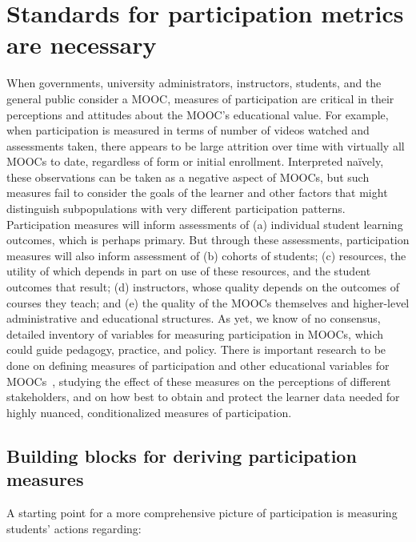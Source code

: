 \section{Standards for participation metrics are necessary}




When governments, university administrators, instructors, students, and
the general public consider a MOOC, measures of participation are
critical in their perceptions and attitudes about the MOOC's educational
value. For example, when participation is measured in terms of number of
videos watched and assessments taken, there appears to be large
attrition over time with virtually all MOOCs to date, regardless of form
or initial enrollment. Interpreted na\"{i}vely, these observations can be
taken as a negative aspect of MOOCs, but such measures fail to consider
the goals of the learner and other factors that might distinguish
subpopulations with very different participation patterns.
Participation measures will inform assessments of (a) individual student
learning outcomes, which is perhaps primary. But through these
assessments, participation measures will also inform assessment of (b)
cohorts of students; (c) resources, the utility of which depends in part
on use of these resources, and the student outcomes that result; (d)
instructors, whose quality depends on the outcomes of courses they
teach; and (e) the quality of the MOOCs themselves and higher-level
administrative and educational structures.  As yet, we know of no
consensus, detailed inventory of variables for measuring participation
in MOOCs, which could guide pedagogy, practice, and policy.
There is
important research to be done on defining measures of participation and
other educational variables for MOOCs~\cite{deboer-ho-reconceptualizing},
studying the effect of these measures on the perceptions of different
stakeholders, and on how best to obtain and protect the
learner data needed for highly nuanced, conditionalized
measures of participation.  

\subsection{Building blocks for deriving participation measures}

A starting point for a more comprehensive picture of
participation is measuring students' actions regarding: 


